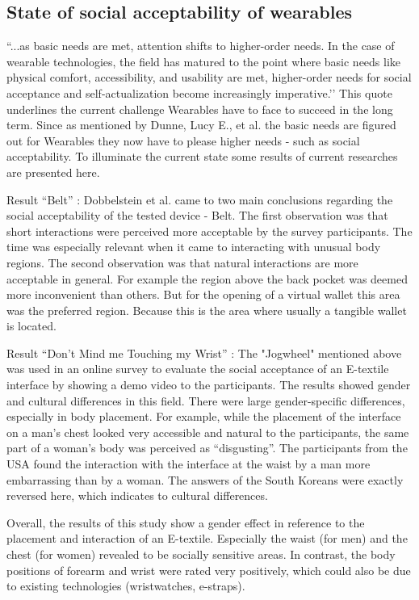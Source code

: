 \documentclass{sigchi}
\begin{document}
\subsection{State of social acceptability of wearables}
``...as basic needs are met, attention shifts to higher-order needs. In the case of wearable technologies, the field has matured to the point where basic needs like physical comfort, accessibility, and usability are met, higher-order needs for social acceptance and self-actualization become increasingly imperative.’’ \cite[p. 4162]{social-comfort} %
This quote underlines the current challenge Wearables have to face to succeed in the long term. Since as mentioned by Dunne, Lucy E., et al. \cite{social-comfort} the basic needs are figured out for Wearables they now have to please higher needs - such as social acceptability. To illuminate the current state some results of current researches are presented here.


Result “Belt” \cite{belt} : Dobbelstein et al. came to two main conclusions regarding the social acceptability of the tested device - Belt. The first observation was that short interactions were perceived more acceptable by the survey participants. The time was especially relevant when it came to interacting with unusual body regions. The second observation was that natural interactions are more acceptable in general. For example the region above the back pocket was deemed more inconvenient than others. But for the opening of a virtual wallet this area was the preferred region. Because this is the area where usually a tangible wallet is located.

Result “Don’t Mind me Touching my Wrist” \cite{touch-wrist}: The "Jogwheel"  mentioned above was used in an online survey to evaluate the social acceptance of an E-textile interface by showing a demo video to the participants. The results showed gender and cultural differences in this field. There were large gender-specific differences, especially in body placement. For example, while the placement of the interface on a man's chest looked very accessible and natural to the participants, the same part of a woman's body was perceived as “disgusting”. \cite{touch-wrist} The participants from the USA found the interaction with the interface at the waist by a man more embarrassing than by a woman. The answers of the South Koreans were exactly reversed here, which indicates to cultural differences. \cite{touch-wrist}

Overall, the results of this study show a gender effect in reference to the placement and interaction of an E-textile. Especially the waist (for men) and the chest (for women) revealed to be socially sensitive areas. In contrast, the body positions of forearm and wrist were rated very positively, which could also be due to existing technologies (wristwatches, e-straps).
\end{document}

